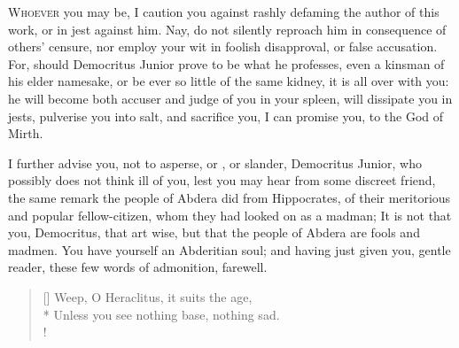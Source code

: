 {\lettrine{W}{hoever} you may be, I caution you against rashly defaming the author of
this work, or  in jest against him. Nay, do not silently
reproach him in consequence of others' censure, nor employ your wit in
foolish disapproval, or false accusation. For, should Democritus Junior
prove to be what he professes, even a kinsman of his elder namesake, or
be ever so little of the same kidney, it is all over with you: he will
become both accuser and judge of you in your spleen, will dissipate you
in jests, pulverise you into salt, and sacrifice you, I can promise
you, to the God of Mirth.

I further advise you, not to asperse, or , or slander,
Democritus Junior, who possibly does not think ill of you, lest you may
hear from some discreet friend, the same remark the people of Abdera
did from Hippocrates, of their meritorious and popular fellow-citizen,
whom they had looked on as a madman; It is not that you, Democritus,
that art wise, but that the people of Abdera are fools and madmen. You
have yourself an Abderitian soul; and having just given you, gentle
reader, these few words of admonition, farewell.

%
%
%
%
%
%
\settowidth{\versewidth}{A thousand Heraclitus', a thousand Democritus' are required.}
\begin{verse}[\versewidth]
Weep, O Heraclitus, it suits the age,\\*
Unless you see nothing base, nothing sad.\\!


\end{verse}}
